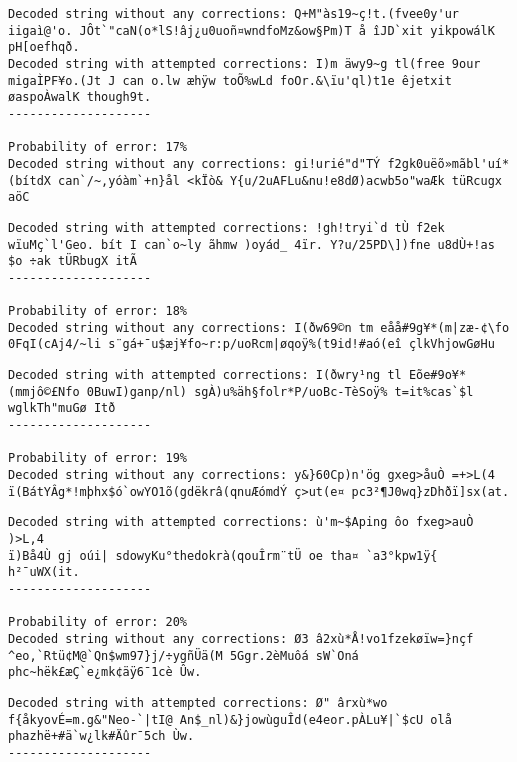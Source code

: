 \documentclass[
  letterpaper,
  DIV=11,
  numbers=noendperiod]{scrartcl}
\begin{document}
\begin{lstlisting}
Decoded string without any corrections: Q+M"às19~ç!t.(fvee0y'ur iigaì@'o. JÔt`"caN(o*lS!âj¿u0uoñ¤wndfoMz&ow§Pm)T å îJD`xit yikpowálK pH[oefhqð.
Decoded string with attempted corrections: I)m äwy9~g tl(free 9our migaÌPF¥o.(Jt J can o.lw æhÿw toÕ%wLd foOr.&\ïu'ql)t1e êjetxit øaspoÀwalK though9t.
--------------------

Probability of error: 17%
Decoded string without any corrections: gi!urié"d"TÝ f2gk0uëõ»mãbl'uí*(bítdX can`/~,yóàm`+n}ål <kÏò& Y{u/2uAFLu&nu!e8dØ)acwb5o"waÆk tüRcugx aöC
\end{lstlisting}

\begin{lstlisting}
Decoded string with attempted corrections: !gh!tryi`d tÙ f2ek wïuMç`l'Geo. bít I can`o~ly ãhmw )oyád_ 4ïr. Y?u/25PD\])fne u8dÙ+!as $o ÷ak tÜRbugX itÃ
--------------------

Probability of error: 18%
Decoded string without any corrections: I(ðw69©n tm eåå#9g¥*(m|zæ-¢\fo 0FqI(cAj4/~li s¨gá+¯u$æj¥fo~r:p/uoRcm|øqoÿ%(t9id!#aó(eî çlkVhjowGøHu
\end{lstlisting}

\begin{lstlisting}
Decoded string with attempted corrections: I(ðwry¹ng tl Eõe#9o¥*(mmjô©£Nfo 0BuwI)ganp/nl) sgÀ)u%äh§folr*P/uoBc-TèSoÿ% t=it%cas`$l wglkTh"muGø Itð
--------------------

Probability of error: 19%
Decoded string without any corrections: y&}60Cp)n'ög gxeg>åuÒ =+>L(4
ï(BátYÂg*!mþhx$ó`owYO1õ(gdëkrâ(qnuÆómdÝ ç>ut(e¤ pc3²¶J0wq}zDhðï]sx(at.
\end{lstlisting}

\begin{lstlisting}
Decoded string with attempted corrections: ù'm~$Aping ôo fxeg>auÒ )>L,4
ï)Bå4Ù gj oúi| sdowyKu°thedokrà(qouÎrm¨tÜ oe tha¤ `a3°kpw1ÿ{ h²¯uWX(it.
--------------------

Probability of error: 20%
Decoded string without any corrections: Ø3 â2xù*Å!vo1fzekøïw=}nçf ^eo,`Rtü¢M@`Qn$wm97}j/÷ygñÜä(M 5Ggr.2èMuôá sW`Oná phc~hëk£æÇ`e¿mk¢äÿ6¯1cè Ûw.
\end{lstlisting}

\begin{lstlisting}
Decoded string with attempted corrections: Ø" ârxù*wo f{åkyovÉ=m.g&"Neo-`|tI@ An$_nl)&}jowùguÎd(e4eor.pÀLu¥|`$cU olå phazhë+#ä`w¿lk#Äûr¯5ch Ùw.
--------------------
\end{lstlisting}
\end{document}
